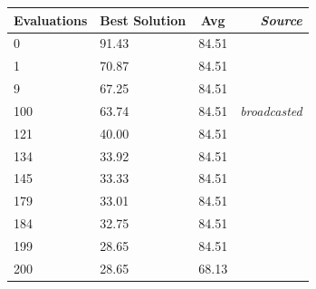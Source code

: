 \begin{table}[h!]
\centering
\begin{tabular}{|l|l|l|l|}
\hline
\multicolumn{1}{|c|}{\textbf{Evaluations}} & \multicolumn{1}{c|}{\textbf{Best Solution}} & \multicolumn{1}{c|}{\textbf{Avg}} & \multicolumn{1}{r|}{\textit{\textbf{Source}}} \\ \hline
0                                          & 91.43                                       & 84.51                             &                                               \\ \hline
1                                          & 70.87                                       & 84.51                             &                                               \\ \hline
9                                          & 67.25                                       & 84.51                             &                                               \\ \hline
100                                        & 63.74                                       & 84.51                             & \multicolumn{1}{r|}{\textit{broadcasted}}     \\ \hline
121                                        & 40.00                                       & 84.51                             &                                               \\ \hline
134                                        & 33.92                                       & 84.51                             &                                               \\ \hline
145                                        & 33.33                                       & 84.51                             &                                               \\ \hline
179                                        & 33.01                                       & 84.51                             &                                               \\ \hline
184                                        & 32.75                                       & 84.51                             &                                               \\ \hline
199                                        & 28.65                                       & 84.51                             &                                               \\ \hline
200                                        & 28.65                                       & 68.13                             &                                               \\ \hline

\end{tabular}
\end{table}
